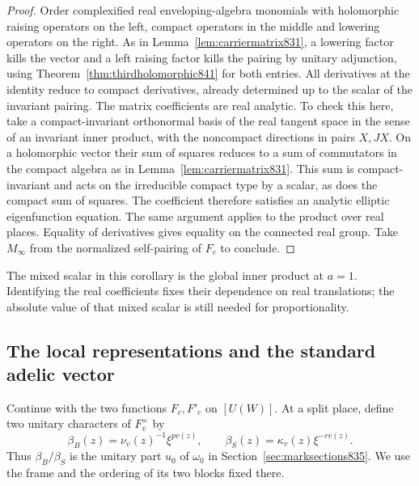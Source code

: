 \documentclass[a4paper,11pt]{article}
\theoremstyle{definition}
\theoremstyle{remark}
\numberwithin{equation}{section}
\begin{document}
\begin{proof}
Order complexified real enveloping-algebra monomials with
holomorphic raising operators on the left, compact operators
in the middle and lowering operators on the right. As in
Lemma~\ref{lem:carriermatrix831}, a lowering factor kills
the vector and a left raising factor kills the pairing by
unitary adjunction, using Theorem~\ref{thm:thirdholomorphic841}
for both entries. All derivatives at the identity reduce
to compact derivatives, already determined up to the scalar
of the invariant pairing. The matrix coefficients are real
analytic. To check this here, take a compact-invariant
orthonormal basis of the real tangent space in the sense of
an invariant inner product, with the noncompact directions
in pairs \(X,JX\). On a holomorphic vector their sum of
squares reduces to a sum of commutators in the compact
algebra as in Lemma~\ref{lem:carriermatrix831}. This sum is
compact-invariant and acts on the irreducible compact type
by a scalar, as does the compact sum of squares. The
coefficient therefore satisfies an analytic elliptic
eigenfunction equation. The same argument applies to the
product over real places. Equality of derivatives gives
equality on the connected real group. Take \(M_\infty\)
from the normalized self-pairing of \(F_c\) to conclude.
\end{proof}

The mixed scalar in this corollary is the global inner
product at \(a=1\). Identifying the real coefficients fixes
their dependence on real translations; the absolute value
of that mixed scalar is still needed for proportionality.
\clearpage

\subsection{The local representations and the standard adelic vector}
\label{sec:thirdadelic842}
Continue with the two functions \(F_c,F'_c\) on \([U(W)]\).
At a split place, define two unitary characters of \(F_v^\times\)
by
\[
       \beta_B(z)=\nu_v(z)^{-1}\xi^{p v(z)},\qquad
       \beta_S(z)=\kappa_v(z)\xi^{-r v(z)} .
\]
Thus \(\beta_B/\beta_S\) is the unitary part \(u_0\) of
\(\omega_0\) in Section~\ref{sec:marksections835}. We use
the frame and the ordering of its two blocks fixed there.
\end{document}
